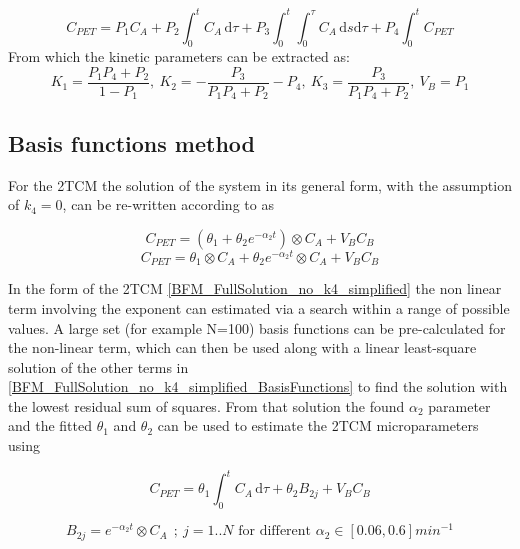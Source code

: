 \begin{equation} \label{microLinearization_no_k4}
C_{PET} = P_1 C_A + P_2 \int_0^t \! C_A \, \mathrm{d}\tau + P_3 \int_0^t \int_0^\tau \! C_A \,\mathrm{d}s \mathrm{d}\tau
+ P_4 \int_0^t \! C_{PET} 
\end{equation}
\newline From which the kinetic parameters can be extracted as: 
\newline
\begin{equation} \label{ParamsLinearization_no_k4}
K_1=\frac{P_1 P_4 + P_2}{1-P_1} ,\  K_2=- \frac{P_3}{P_1 P_4 + P_2} - P_4 ,\ K_3=\frac{P_3}{P_1 P_4 + P_2} ,\  V_B = P_1
\end{equation}

\subsection{Basis functions method}
For the 2TCM the solution of the system in its general form, with the assumption of $k_4 = 0$, can be re-written according to \cite{Hong2010} as 

\begin{equation} \label{BFM_FullSolution_no_k4}
C_{PET} = (\theta_1 + \theta_2 e^{-\alpha_2 t } ) \otimes C_A + V_B C_B
\end{equation}
\begin{equation} \label{BFM_FullSolution_no_k4_simplified}
C_{PET} = \theta_1 \otimes C_A + \theta_2 e^{-\alpha_2 t } \otimes C_A   + V_B C_B
\end{equation}

In the form of the 2TCM \ref{BFM_FullSolution_no_k4_simplified} the non linear term involving the exponent can estimated via a search within a range of possible values. A large set (for example N=100) basis functions can be pre-calculated for the non-linear term, which can then be used along with a linear least-square solution of the other terms in \ref{BFM_FullSolution_no_k4_simplified_BasisFunctions} to find the solution with the lowest residual sum of squares. From that solution the found $\alpha_2$ parameter and the fitted $\theta_1$ and $\theta_2$ can be used to estimate the 2TCM microparameters using

\begin{equation} \label{BFM_FullSolution_no_k4_simplified_BasisFunctions}
C_{PET} = \theta_1 \int_0^t \! C_A \, \mathrm{d}\tau + \theta_2 B_{2j}   + V_B C_B
\end{equation}

\begin{equation} \label{BasisFunctions}
B_{2j} = e^{-\alpha_2 t } \otimes C_A   \ \ ; \  j=1..N \textrm{ for different } \alpha_2 \in [0.06,0.6]min^{-1}
\end{equation}


